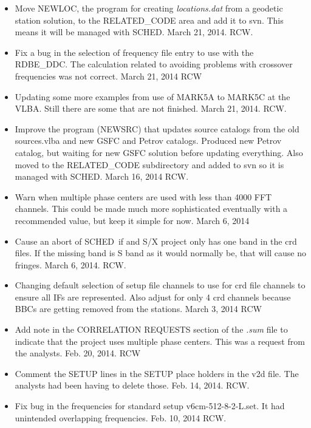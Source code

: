 \documentclass{report}
\newcommand{\sched}{{\sc SCHED}}
\newcommand{\schedb}{{\sc SCHED~}}
\begin{document}
\begin{itemize}
\item Move NEWLOC, the program for creating {\sl locations.dat} from a
geodetic station solution, to the RELATED\_CODE area and add it to
svn.  This means it will be managed with \sched.  March 21, 2014.  RCW.

\item Fix a bug in the selection of frequency file entry to use with
the RDBE\_DDC.  The calculation related to avoiding problems with crossover
frequencies was not correct.   March 21, 2014  RCW

\item Updating some more examples from use of MARK5A to MARK5C at the
VLBA.  Still there are some that are not finished.  March 21, 2014.  RCW.

\item Improve the program (NEWSRC) that updates source catalogs from
the old sources.vlba and new GSFC and Petrov catalogs.  Produced new
Petrov catalog, but waiting for new GSFC solution before updating
everything.  Also moved to the RELATED\_CODE subdirectory and added
to svn so it is managed with \sched.  March 16, 2014  RCW.

\item Warn when multiple phase centers are used with less than 4000
FFT channels.  This could be made much more sophisticated eventually
with a recommended value, but keep it simple for now.  March 6, 2014

\item Cause an abort of \schedb if and S/X project only has one band
in the crd files.  If the missing band is S band as it would normally
be, that will cause no fringes.  March 6, 2014.  RCW.

\item  Changing default selection of setup file channels to use for crd
file channels to ensure all IFs are represented.  Also adjust for only
4 crd channels because BBCs are getting removed from the stations.
March 3, 2014 RCW

\item  Add note in the CORRELATION REQUESTS section of the {\sl .sum} file
to indicate that the project uses multiple phase centers.  This was a
request from the analysts.  Feb. 20, 2014.  RCW

\item  Comment the SETUP lines in the SETUP place holders in the v2d file.
The analysts had been having to delete those.  Feb. 14, 2014.  RCW.

\item  Fix bug in the frequencies for standard setup v6cm-512-8-2-L.set.  It 
had unintended overlapping frequencies.  Feb. 10, 2014  RCW.


\end{itemize}
\end{document}
